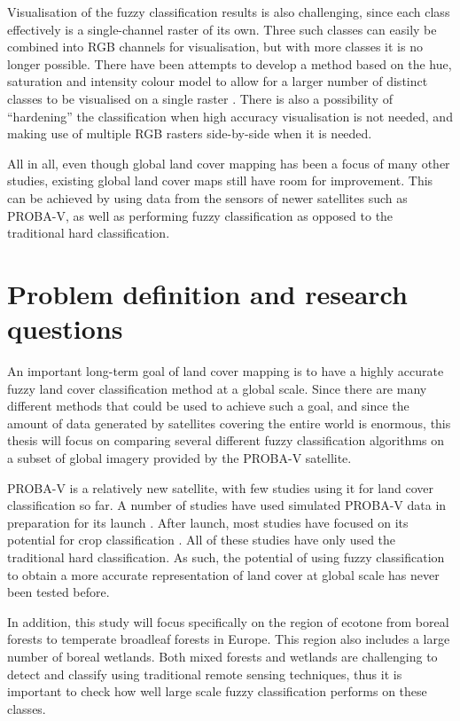 \documentclass[a4paper,10pt]{article}
\begin{document}
Visualisation of the fuzzy classification results is also challenging, since each class effectively is a single-channel raster of its own. Three such classes can easily be combined into RGB channels for visualisation, but with more classes it is no longer possible. There have been attempts to develop a method based on the hue, saturation and intensity colour model to allow for a larger number of distinct classes to be visualised on a single raster \citep{hengl2004fuzzycmeans}. There is also a possibility of ``hardening'' the classification when high accuracy visualisation is not needed, and making use of multiple RGB rasters side-by-side when it is needed.

All in all, even though global land cover mapping has been a focus of many other studies, existing global land cover maps still have room for improvement. This can be achieved by using data from the sensors of newer satellites such as PROBA-V, as well as performing fuzzy classification as opposed to the traditional hard classification.

\section{Problem definition and research questions}

An important long-term goal of land cover mapping is to have a highly accurate fuzzy land cover classification method at a global scale. Since there are many different methods that could be used to achieve such a goal, and since the amount of data generated by satellites covering the entire world is enormous, this thesis will focus on comparing several different fuzzy classification algorithms on a subset of global imagery provided by the PROBA-V satellite.

PROBA-V is a relatively new satellite, with few studies using it for land cover classification so far. A number of studies have used simulated PROBA-V data in preparation for its launch \citep{stathakis2014probavurban,roumenina2013probavcrops,bartalev2014probavboreal}. After launch, most studies have focused on its potential for crop classification \citep{roumenina2015probavcrops,durgun2016crop,lambert2016cropland}. All of these studies have only used the traditional hard classification. As such, the potential of using fuzzy classification to obtain a more accurate representation of land cover at global scale has never been tested before.

In addition, this study will focus specifically on the region of ecotone from boreal forests to temperate broadleaf forests in Europe. This region also includes a large number of boreal wetlands. Both mixed forests and wetlands are challenging to detect and classify using traditional remote sensing techniques, thus it is important to check how well large scale fuzzy classification performs on these classes.
\end{document}
